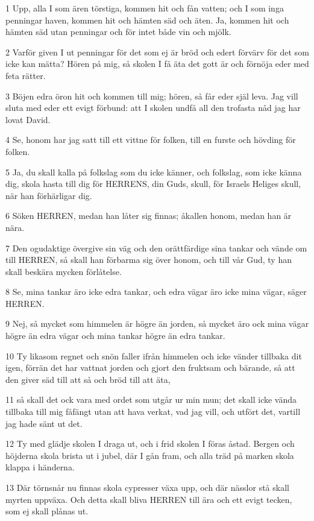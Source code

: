 \par 1 Upp, alla I som ären törstiga, kommen hit och fån vatten; och I som inga penningar haven, kommen hit och hämten säd och äten. Ja, kommen hit och hämten säd utan penningar och för intet både vin och mjölk.
\par 2 Varför given I ut penningar för det som ej är bröd och edert förvärv för det som icke kan mätta? Hören på mig, så skolen I få äta det gott är och förnöja eder med feta rätter.
\par 3 Böjen edra öron hit och kommen till mig; hören, så får eder själ leva. Jag vill sluta med eder ett evigt förbund: att I skolen undfå all den trofasta nåd jag har lovat David.
\par 4 Se, honom har jag satt till ett vittne för folken, till en furste och hövding för folken.
\par 5 Ja, du skall kalla på folkslag som du icke känner, och folkslag, som icke känna dig, skola hasta till dig för HERRENS, din Guds, skull, för Israels Heliges skull, när han förhärligar dig.
\par 6 Söken HERREN, medan han låter sig finnas; åkallen honom, medan han är nära.
\par 7 Den ogudaktige övergive sin väg och den orättfärdige sina tankar och vände om till HERREN, så skall han förbarma sig över honom, och till vår Gud, ty han skall beskära mycken förlåtelse.
\par 8 Se, mina tankar äro icke edra tankar, och edra vägar äro icke mina vägar, säger HERREN.
\par 9 Nej, så mycket som himmelen är högre än jorden, så mycket äro ock mina vägar högre än edra vägar och mina tankar högre än edra tankar.
\par 10 Ty likasom regnet och snön faller ifrån himmelen och icke vänder tillbaka dit igen, förrän det har vattnat jorden och gjort den fruktsam och bärande, så att den giver säd till att så och bröd till att äta,
\par 11 så skall det ock vara med ordet som utgår ur min mun; det skall icke vända tillbaka till mig fåfängt utan att hava verkat, vad jag vill, och utfört det, vartill jag hade sänt ut det.
\par 12 Ty med glädje skolen I draga ut, och i frid skolen I föras åstad. Bergen och höjderna skola brista ut i jubel, där I gån fram, och alla träd på marken skola klappa i händerna.
\par 13 Där törnsnår nu finnas skola cypresser växa upp, och där nässlor stå skall myrten uppväxa. Och detta skall bliva HERREN till ära och ett evigt tecken, som ej skall plånas ut.

